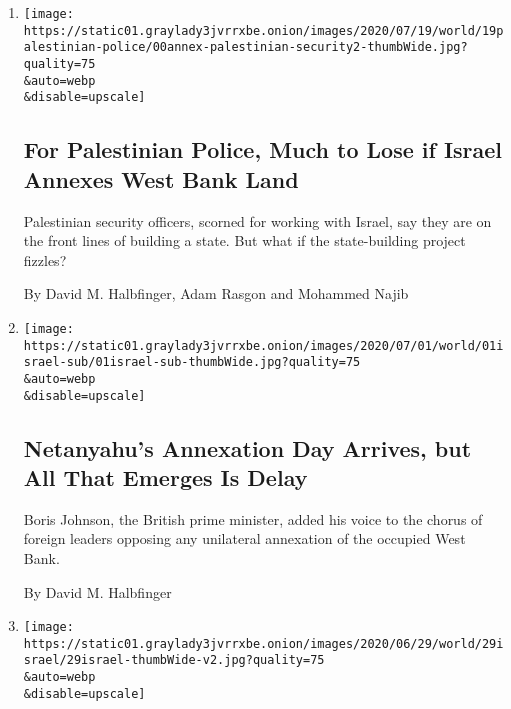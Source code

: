 \begin{enumerate}
\def\labelenumi{\arabic{enumi}.}
\item
  \href{/2020/07/22/world/middleeast/palestinian-police-annex-israel.html}{}

  \texttt{[image: https://static01.graylady3jvrrxbe.onion/images/2020/07/19/world/19palestinian-police/00annex-palestinian-security2-thumbWide.jpg?quality=75\\\&auto=webp\\\&disable=upscale]}

  \hypertarget{for-palestinian-police-much-to-lose-if-israel-annexes-west-bank-land}{%
  \subsection{For Palestinian Police, Much to Lose if Israel Annexes
  West Bank
  Land}\label{for-palestinian-police-much-to-lose-if-israel-annexes-west-bank-land}}

  Palestinian security officers, scorned for working with Israel, say
  they are on the front lines of building a state. But what if the
  state-building project fizzles?

  By David M. Halbfinger, Adam Rasgon and Mohammed Najib
\item
  \href{/2020/07/01/world/middleeast/israel-annexation-netanyahu-johnson.html}{}

  \texttt{[image: https://static01.graylady3jvrrxbe.onion/images/2020/07/01/world/01israel-sub/01israel-sub-thumbWide.jpg?quality=75\\\&auto=webp\\\&disable=upscale]}

  \hypertarget{netanyahus-annexation-day-arrives-but-all-that-emerges-is-delay}{%
  \subsection{Netanyahu's Annexation Day Arrives, but All That Emerges
  Is
  Delay}\label{netanyahus-annexation-day-arrives-but-all-that-emerges-is-delay}}

  Boris Johnson, the British prime minister, added his voice to the
  chorus of foreign leaders opposing any unilateral annexation of the
  occupied West Bank.

  By David M. Halbfinger
\item
  \href{/2020/06/29/world/middleeast/israel-ambassador-residence-sale.html}{}

  \texttt{[image: https://static01.graylady3jvrrxbe.onion/images/2020/06/29/world/29israel/29israel-thumbWide-v2.jpg?quality=75\\\&auto=webp\\\&disable=upscale]}


\end{enumerate}
